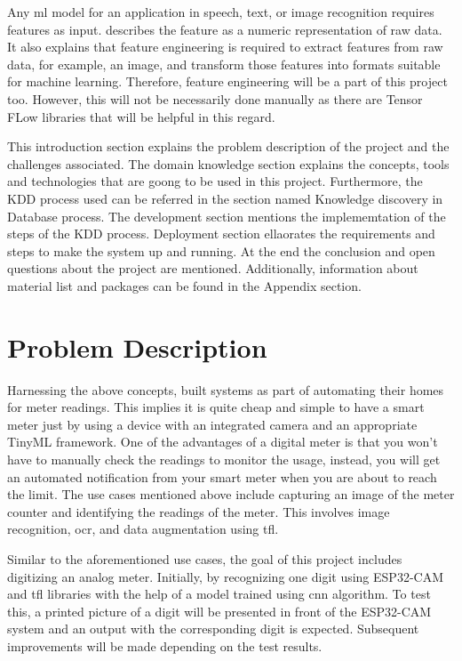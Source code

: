 Any \ac{ml} model for an application in speech, text, or image recognition requires features as input. \cite{Zheng:2018} describes the feature as a numeric representation of raw data. It also explains that feature engineering is required to extract features from raw data, for example, an image, and transform those features into formats suitable for machine learning. Therefore, feature engineering will be a part of this project too. However, this will not be necessarily done manually as there are Tensor FLow libraries that will be helpful in this regard.

This introduction section explains the problem description of the project and the challenges associated. The domain knowledge section explains the concepts, tools and technologies that are goong to be used in this project. Furthermore, the KDD process used can be referred in the section named Knowledge discovery in Database process. The development section mentions the implememtation of the steps of the KDD process. Deployment section ellaorates the requirements and steps to make the system up and running. At the end the conclusion and open questions about the project are mentioned. Additionally, information about material list and packages can be found in the Appendix section.

\section{Problem Description}

Harnessing the above concepts, \cite{Sparber:2020,JHTECH:2017,List:2021} built systems as part of automating their homes for meter readings. This implies it is quite cheap and simple to have a smart meter just by using a device with an integrated camera and an appropriate TinyML framework. One of the advantages of a digital meter is that you won't have to manually check the readings to monitor the usage, instead, you will get an automated notification from your smart meter when you are about to reach the limit. The use cases mentioned above include capturing an image of the meter counter and identifying the readings of the meter. This involves image recognition, \ac{ocr}, and data augmentation using \ac{tfl}.

Similar to the aforementioned use cases, the goal of this project includes digitizing an analog meter. Initially, by recognizing one digit using ESP32-CAM and \ac{tfl} libraries with the help of a model trained using \ac{cnn} algorithm. To test this, a printed picture of a digit will be presented in front of the ESP32-CAM system and an output with the corresponding digit is expected. Subsequent improvements will be made depending on the test results.

